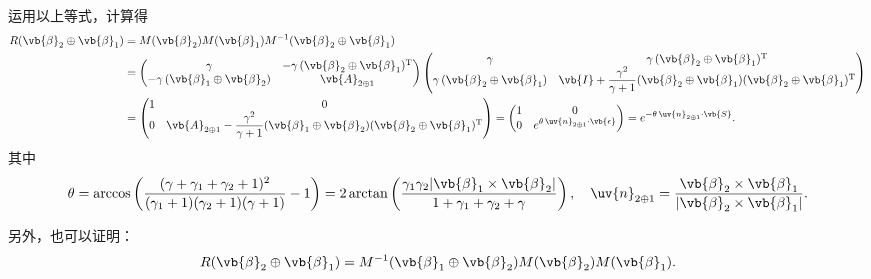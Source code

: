 运用以上等式，计算得
\begin{align*}
	R(\vb{\beta}_2 \oplus \vb{\beta}_1) & = M(\vb{\beta}_2) M(\vb{\beta}_1) M^{-1}(\vb{\beta}_2 \oplus \vb{\beta}_1) \\&=
	\begin{pmatrix}
		\gamma                                        & -\gamma \, (\vb{\beta}_2 \oplus \vb{\beta}_1)^\mathrm{T} \\
		-\gamma \, (\vb{\beta}_1 \oplus \vb{\beta}_2) & \vb{A}_{2 \oplus 1}
	\end{pmatrix}
	\begin{pmatrix}
		\gamma                                       & \gamma \, (\vb{\beta}_2 \oplus \vb{\beta}_1)^\mathrm{T}                                                               \\
		\gamma \, (\vb{\beta}_2 \oplus \vb{\beta}_1) & \vb{I} + \dfrac{\gamma^2}{\gamma + 1} (\vb{\beta}_2 \oplus \vb{\beta}_1)(\vb{\beta}_2 \oplus \vb{\beta}_1)^\mathrm{T}
	\end{pmatrix}
	\\&=
	\begin{pmatrix}
		1 & 0                                                                                                                                  \\
		0 & \vb{A}_{2 \oplus 1} - \dfrac{\gamma^2}{\gamma + 1} (\vb{\beta}_1 \oplus \vb{\beta}_2)(\vb{\beta}_2 \oplus \vb{\beta}_1)^\mathrm{T}
	\end{pmatrix} =
	\begin{pmatrix}
		1 & 0                                                     \\
		0 & e^{\theta \, \uv{n}_{2 \oplus 1} \cdot \vb{\epsilon}}
	\end{pmatrix} = e^{-\theta \, \uv{n}_{2 \oplus 1} \cdot \vb{S}}.
\end{align*}
其中
\begin{equation*}
	\theta = \arccos\left( \dfrac{(\gamma + \gamma_1 + \gamma_2 + 1)^2}{(\gamma_1 + 1)(\gamma_2 + 1)(\gamma + 1)} - 1 \right) = 2 \arctan\left( \dfrac{\gamma_1 \gamma_2 |\vb{\beta}_1 \times \vb{\beta}_2|}{1 + \gamma_1 + \gamma_2 + \gamma} \right),\quad
	\uv{n}_{2 \oplus 1} = \dfrac{\vb{\beta}_2 \times \vb{\beta}_1}{|\vb{\beta}_2 \times \vb{\beta}_1|}.
\end{equation*}

另外，也可以证明：
\begin{equation*}
	R(\vb{\beta}_2 \oplus \vb{\beta}_1) = M^{-1}(\vb{\beta}_1 \oplus \vb{\beta}_2) M(\vb{\beta}_2) M(\vb{\beta}_1).
\end{equation*}


